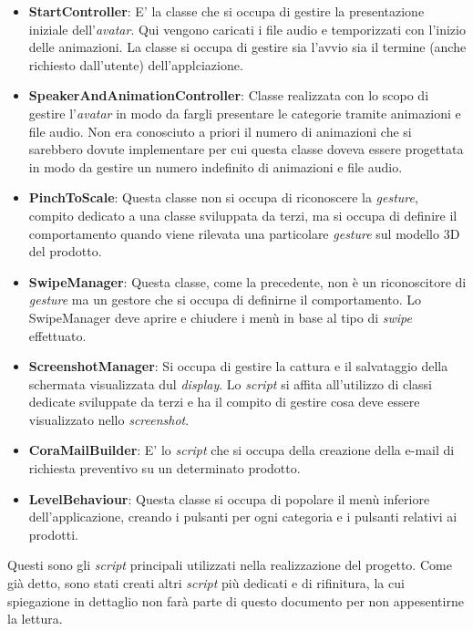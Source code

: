\begin{itemize}
	\item \textbf{StartController}: E' la classe che si occupa di gestire la presentazione iniziale dell'\textit{avatar\gloss}. Qui vengono caricati i file audio e temporizzati con l'inizio delle animazioni. La classe si occupa di gestire sia l'avvio sia il termine (anche richiesto dall'utente) dell'applciazione.
	
	\item \textbf{SpeakerAndAnimationController}: Classe realizzata con lo scopo di gestire l'\textit{avatar\gloss} in modo da fargli presentare le categorie tramite animazioni e file audio. Non era conosciuto a priori il numero di animazioni che si sarebbero dovute implementare per cui questa classe doveva essere progettata in modo da gestire un numero indefinito di animazioni e file audio.
	
	\item \textbf{PinchToScale}: Questa classe non si occupa di riconoscere la \textit{gesture}, compito dedicato a una classe sviluppata da terzi, ma si occupa di definire il comportamento quando viene rilevata una particolare \textit{gesture} sul modello 3D del prodotto.
	
	\item \textbf{SwipeManager}: Questa classe, come la precedente, non \`e un riconoscitore di \textit{gesture} ma un gestore che si occupa di definirne il comportamento. Lo SwipeManager deve aprire e chiudere i men\`u in base al tipo di \textit{swipe} effettuato.
	
	\item \textbf{ScreenshotManager}: Si occupa di gestire la cattura e il salvataggio della schermata visualizzata dul \textit{display}. Lo \textit{script} si affita all'utilizzo di classi dedicate sviluppate da terzi e ha il compito di gestire cosa deve essere visualizzato nello \textit{screenshot}.
	
	\item \textbf{CoraMailBuilder}: E' lo \textit{script} che si occupa della creazione della e-mail di richiesta preventivo su un determinato prodotto.
	
	\item \textbf{LevelBehaviour}: Questa classe si occupa di popolare il men\`u inferiore dell'applicazione, creando i pulsanti per ogni categoria e i pulsanti relativi ai prodotti.
\end{itemize}

Questi sono gli \textit{script} principali utilizzati nella realizzazione del progetto. Come gi\`a detto, sono stati creati altri \textit{script} pi\`u dedicati e di rifinitura, la cui spiegazione in dettaglio non far\`a parte di questo documento per non appesentirne la lettura.\\\\

